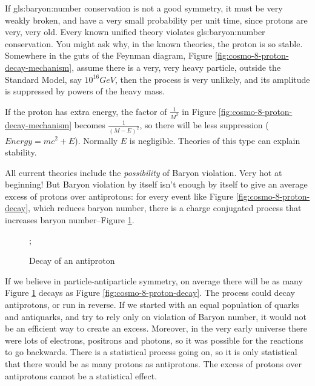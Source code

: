 \documentclass[]{article}
\begin{document}
 If \gls{gls:baryon:number} conservation is not a good symmetry, it must be very weakly broken, and have a very small probability per unit time, since protons are very, very old. Every known unified theory violates \gls{gls:baryon:number} conservation.  You might ask why, in the known theories, the proton is so stable. Somewhere in the guts of the Feynman diagram, Figure \ref{fig:cosmo-8-proton-decay-mechanism}, assume there is a very, very heavy particle, outside the Standard Model, say $10^{16}GeV$, then the process is very unlikely, and its amplitude is suppressed by powers of the heavy mass.
 
 If the proton has extra energy, the factor of $\frac{1}{M^2}$ in Figure \ref{fig:cosmo-8-proton-decay-mechanism} becomes $\frac{1}{(M-E)^2}$, so there will be less suppression ($Energy=m c^2 + E$). Normally $E$ is negligible. Theories of this type can explain stability.
 
 All current theories include the \emph{possibility} of Baryon violation.
  Very hot at beginning! But Baryon violation by itself isn't enough by itself to give an average excess of protons over antiprotons: for every event like  Figure \ref{fig:cosmo-8-proton-decay}, which reduces baryon number, there is a charge conjugated process that increases baryon number--Figure \ref{fig:cosmo-8-anti-proton-decay}. 
 
 \begin{figure}[H]
 	\caption{Decay of an antiproton}\label{fig:cosmo-8-anti-proton-decay}
	 \begin{center}
	 	;
	 \end{center}
 \end{figure}
 
 If we believe in particle-antiparticle symmetry, on average there will be as many Figure \ref{fig:cosmo-8-anti-proton-decay} decays as Figure \ref{fig:cosmo-8-proton-decay}. The process could decay antiprotons, or run in reverse. If we started with an equal population of quarks and antiquarks, and try to rely only on violation of Baryon number, it would not be an efficient way to create an excess. Moreover, in the very early universe there were lots of electrons, positrons and photons, so it was possible for the reactions to go backwards. There is a statistical process going on, so it is only statistical that there would be as many protons as antiprotons. The excess of protons over antiprotons cannot be a statistical effect.
 
\end{document}
